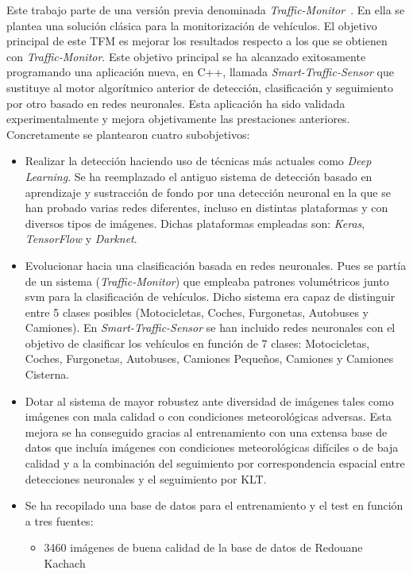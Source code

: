 Este trabajo parte de una versión previa denominada \textit{Traffic-Monitor}~\cite{traffic_monitor_redo}. En ella se plantea una solución clásica para la monitorización de vehículos. El objetivo principal de este TFM es mejorar los resultados respecto a los que se obtienen con \textit{Traffic-Monitor}. Este objetivo principal se ha alcanzado exitosamente programando una
aplicación nueva, en C++, llamada \textit{Smart-Traffic-Sensor} que sustituye al motor algorítmico anterior de detección, clasificación y seguimiento por otro basado en redes neuronales. Esta aplicación ha sido validada experimentalmente y mejora objetivamente las prestaciones anteriores. Concretamente se plantearon cuatro  subobjetivos:
\begin{itemize}
    \item Realizar la detección haciendo uso de técnicas más actuales como \textit{Deep Learning}. Se ha reemplazado el antiguo sistema de detección basado en aprendizaje y sustracción de fondo por una detección neuronal en la que se han probado varias redes diferentes, incluso en distintas plataformas y con diversos tipos de imágenes. Dichas plataformas empleadas son: \textit{Keras}, \textit{TensorFlow} y \textit{Darknet}.
    \item Evolucionar hacia una clasificación basada en redes neuronales. Pues se partía de un sistema (\textit{Traffic-Monitor}) que empleaba patrones volumétricos junto \acrshort{svm} para la clasificación de vehículos. Dicho sistema era capaz de distinguir entre 5 clases posibles (Motocicletas, Coches, Furgonetas, Autobuses y Camiones). En \textit{Smart-Traffic-Sensor} se han incluido redes neuronales con el objetivo de clasificar los vehículos en función de 7 clases: Motocicletas, Coches, Furgonetas, Autobuses, Camiones Pequeños, Camiones y Camiones Cisterna.
    \item Dotar al sistema de mayor robustez ante diversidad de imágenes tales como imágenes con mala calidad o con condiciones meteorológicas adversas. Esta mejora se ha conseguido gracias al entrenamiento con una extensa base de datos que incluía imágenes con condiciones meteorológicas difíciles o de baja calidad y a la combinación del seguimiento por correspondencia espacial entre detecciones neuronales y el seguimiento por KLT.
    \item Se ha recopilado una base de datos para el entrenamiento y el test en función a tres fuentes: 
    \begin{itemize}
        \item 3460 imágenes de buena calidad de la base de datos de Redouane Kachach~\cite{traffic_monitor_lab}

\end{itemize}
\end{itemize}
